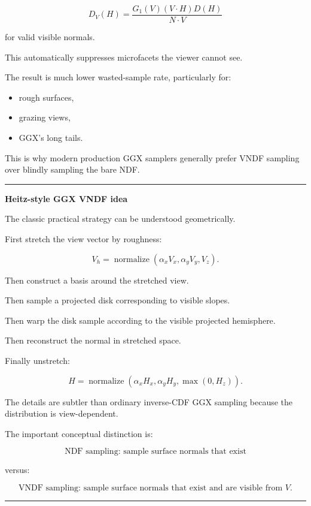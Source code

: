 \[
\boxed{
D_V(H)
=
\frac{
G_1(V)
(V\cdot H)
D(H)
}{
N\cdot V
}
}
\]

for valid visible normals.

This automatically suppresses microfacets the viewer cannot see.

The result is much lower wasted-sample rate, particularly for:

\begin{itemize}
\tightlist
\item
  rough surfaces,
\item
  grazing views,
\item
  GGX's long tails.
\end{itemize}

This is why modern production GGX samplers generally prefer VNDF sampling over blindly sampling the bare NDF.

\begin{center}\rule{0.5\linewidth}{0.5pt}\end{center}

\textbf{Heitz-style GGX VNDF idea}

The classic practical strategy can be understood geometrically.

First stretch the view vector by roughness:

\[
V_h=
\operatorname{normalize}
(
\alpha_xV_x,
\alpha_yV_y,
V_z
).
\]

Then construct a basis around the stretched view.

Then sample a projected disk corresponding to visible slopes.

Then warp the disk sample according to the visible projected hemisphere.

Then reconstruct the normal in stretched space.

Finally unstretch:

\[
H=
\operatorname{normalize}
(
\alpha_xH_x,
\alpha_yH_y,
\max(0,H_z)
).
\]

The details are subtler than ordinary inverse-CDF GGX sampling because the distribution is view-dependent.

The important conceptual distinction is:

\[
\boxed{
\text{NDF sampling: sample surface normals that exist}
}
\]

versus:

\[
\boxed{
\text{VNDF sampling: sample surface normals that exist and are visible from }V.
}
\]

\begin{center}\rule{0.5\linewidth}{0.5pt}\end{center}

